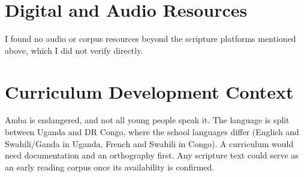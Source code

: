 \documentclass[12pt]{article}
\begin{document}
\section{Digital and Audio Resources}
I found no audio or corpus resources beyond the scripture platforms mentioned above, which I did not verify directly.

\section{Curriculum Development Context}
Amba is endangered, and not all young people speak it. The language is split between Uganda and DR Congo, where the school languages differ (English and Swahili/Ganda in Uganda, French and Swahili in Congo). A curriculum would need documentation and an orthography first. Any scripture text could serve as an early reading corpus once its availability is confirmed.
\end{document}
